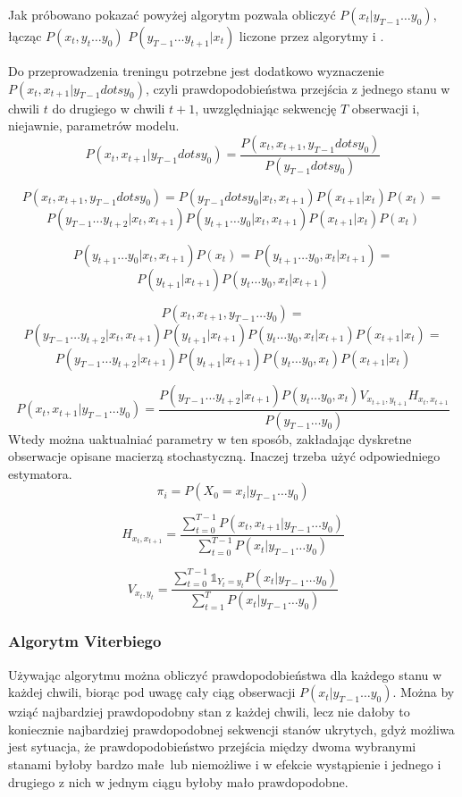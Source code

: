 Jak próbowano pokazać powyżej algorytm  pozwala obliczyć $P(x_t | y_{T-1} \dots y_0)$,
łącząc $P(x_t, y_t \dots y_0)$ $P(y_{T-1} \dots y_{t+1} | x_t)$ liczone przez algorytmy  i .

Do przeprowadzenia treningu  potrzebne jest dodatkowo wyznaczenie $P(x_t, x_{t+1} | y_{T-1} dots y_0)$,
czyli prawdopodobieństwa przejścia z jednego stanu w chwili $t$ do drugiego w chwili $t+1$,
uwzględniając sekwencję $T$ obserwacji i, niejawnie, parametrów modelu.
$$P(x_t, x_{t+1} | y_{T-1} dots y_0)
= \frac{P(x_t, x_{t+1}, y_{T-1} dots y_0)}{P(y_{T-1} dots y_0)}$$

$$P(x_t, x_{t+1}, y_{T-1} dots y_0) = P(y_{T-1} dots y_0 | x_t, x_{t+1}) P(x_{t+1} | x_t) P(x_t) = $$
$$P(y_{T-1} \dots y_{t+2} | x_t, x_{t+1}) P(y_{t+1} \dots y_0 | x_t, x_{t+1}) P(x_{t+1} | x_t) P(x_t)$$

$$P(y_{t+1} \dots y_0 | x_t, x_{t+1}) P(x_t) = P(y_{t+1} \dots y_0, x_t | x_{t+1}) = $$
$$P(y_{t+1} | x_{t+1}) P(y_t \dots y_0, x_t | x_{t+1})$$

$$P(x_t, x_{t+1}, y_{T-1} \dots y_0) =$$
$$P(y_{T-1} \dots y_{t+2} | x_t, x_{t+1}) P(y_{t+1} | x_{t+1}) P(y_t \dots y_0, x_t | x_{t+1}) P(x_{t+1} | x_t) =$$
$$P(y_{T-1} \dots y_{t+2} | x_{t+1}) P(y_{t+1} | x_{t+1}) P(y_t \dots y_0, x_t) P(x_{t+1} | x_t)$$

$$P(x_t, x_{t+1} | y_{T-1} \dots y_0)
= \frac{P(y_{T-1} \dots y_{t+2} | x_{t+1}) P(y_t \dots y_0, x_t) V_{x_{t+1}, y_{t+1}} H_{x_t, x_{t+1}}}{P(y_{T-1} \dots y_0)}$$
Wtedy można uaktualniać parametry w ten sposób, zakładając dyskretne obserwacje opisane macierzą stochastyczną. Inaczej trzeba użyć odpowiedniego estymatora.
$$\pi_i = P(X_0 = x_i | y_{T-1} \dots y_0)$$

$$H_{x_t, x_{t+1}} = \frac{\sum_{t=0}^{T-1} P(x_t, x_{t+1} | y_{T-1} \dots y_0)}{\sum_{t=0}^{T-1} P(x_t | y_{T-1} \dots y_0)}$$

$$V_{x_t, y_t} = \frac{\sum_{t=0}^{T-1} \mathbb{1}_{Y_t = y_t} P(x_t | y_{T-1} \dots y_0)}{\sum_{t=1}^T P(x_t | y_{T-1} \dots y_0)}$$

\subsubsection{Algorytm Viterbiego}

Używając algorytmu  można obliczyć prawdopodobieństwa dla każdego stanu w każdej chwili, biorąc
pod uwagę cały ciąg obserwacji $P(x_t | y_{T-1} \dots y_0)$. Można by wziąć najbardziej prawdopodobny stan z każdej chwili,
lecz nie dałoby to koniecznie najbardziej prawdopodobnej sekwencji stanów ukrytych, gdyż możliwa jest sytuacja, że
prawdopodobieństwo przejścia między dwoma wybranymi stanami byłoby bardzo małe lub niemożliwe i w efekcie wystąpienie
i jednego i drugiego z nich w jednym ciągu byłoby mało prawdopodobne.

